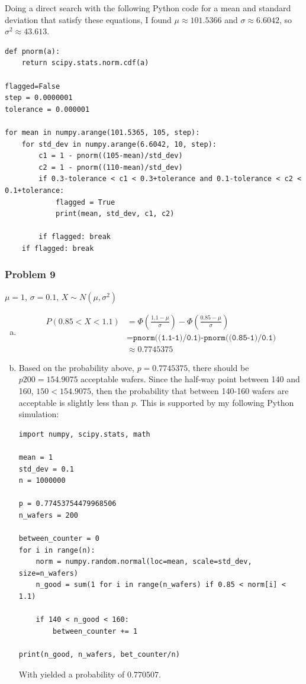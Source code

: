 \documentclass[11pt]{extarticle}
\begin{document}
Doing a direct search with the following Python code for a mean and standard deviation that satisfy these equations, I found $\boxed{ \mu \approx 101.5366 }$ and $\sigma \approx 6.6042$, so $\boxed{ \sigma^2 \approx 43.613 }$.

\tiny
\begin{verbatim}
def pnorm(a):
    return scipy.stats.norm.cdf(a)

flagged=False 
step = 0.0000001
tolerance = 0.000001

for mean in numpy.arange(101.5365, 105, step):
    for std_dev in numpy.arange(6.6042, 10, step):
        c1 = 1 - pnorm((105-mean)/std_dev)
        c2 = 1 - pnorm((110-mean)/std_dev)
        if 0.3-tolerance < c1 < 0.3+tolerance and 0.1-tolerance < c2 < 0.1+tolerance: 
            flagged = True
            print(mean, std_dev, c1, c2)
    
        if flagged: break 
    if flagged: break 
\end{verbatim}
\normalsize

\subsubsection*{Problem 9}

$\mu = 1$, $\sigma=0.1$, $X \sim N(\mu, \sigma^2)$

\begin{enumerate}[(a)]
\item \begin{align*} P( 0.85 < X < 1.1) & = \Phi\left( \frac{1.1-\mu}{\sigma} \right) - \Phi\left( \frac{0.85-\mu}{\sigma} \right) \\ 
& = \texttt{pnorm((1.1-1)/0.1)-pnorm((0.85-1)/0.1)} \\
& \approx \boxed{0.7745375} 
\end{align*}

\item Based on the probability above, $p=0.7745375$, there should be $p200 = 154.9075$ acceptable wafers. Since the half-way point between 140 and 160, $150 < 154.9075$, then the probability that between 140-160 wafers are acceptable is slightly less than $p$. This is supported by my following Python simulation:
\tiny
\begin{verbatim}
import numpy, scipy.stats, math 

mean = 1
std_dev = 0.1
n = 1000000

p = 0.77453754479968506
n_wafers = 200

between_counter = 0
for i in range(n): 
    norm = numpy.random.normal(loc=mean, scale=std_dev, size=n_wafers)
    n_good = sum(1 for i in range(n_wafers) if 0.85 < norm[i] < 1.1)

    if 140 < n_good < 160: 
        between_counter += 1
 
print(n_good, n_wafers, bet_counter/n)
\end{verbatim}
\normalsize

With yielded a probability of $\boxed{ 0.770507}$.

\end{enumerate}
\end{document}
